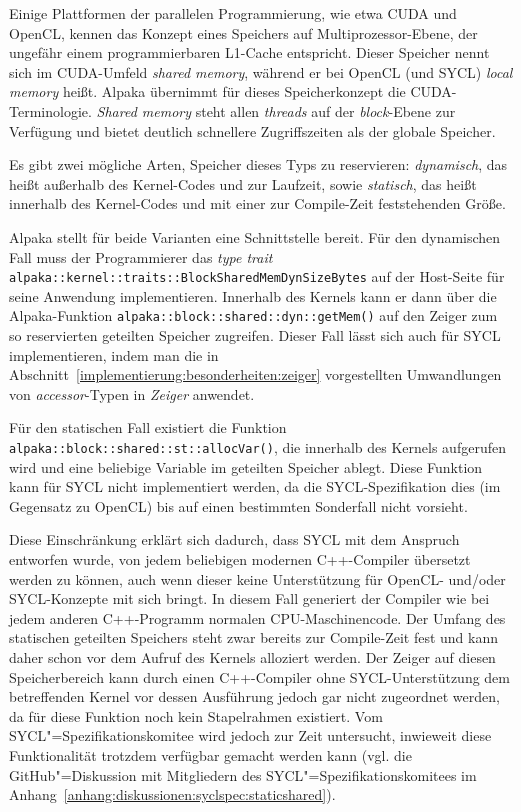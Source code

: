 Einige Plattformen der parallelen Programmierung, wie etwa CUDA und OpenCL,
kennen das Konzept eines Speichers auf Multiprozessor-Ebene, der ungefähr
einem programmierbaren L1-Cache entspricht. Dieser Speicher nennt sich im
CUDA-Umfeld \textit{shared memory}, während er bei OpenCL (und SYCL)
\textit{local memory} heißt. Alpaka übernimmt für dieses Speicherkonzept die
CUDA-Terminologie. \textit{Shared memory} steht allen \textit{threads} auf
der \textit{block}-Ebene zur Verfügung und bietet deutlich schnellere
Zugriffszeiten als der globale Speicher.

Es gibt zwei mögliche Arten, Speicher dieses Typs zu reservieren:
\textit{dynamisch}, das heißt außerhalb des Kernel-Codes und zur Laufzeit, sowie
\textit{statisch}, das heißt innerhalb des Kernel-Codes und mit einer zur
Compile-Zeit feststehenden Größe.

Alpaka stellt für beide Varianten eine Schnittstelle bereit. Für den dynamischen
Fall muss der Programmierer das \textit{type trait}
\texttt{alpaka::kernel::traits::BlockSharedMemDynSizeBytes} auf der Host-Seite
für seine Anwendung implementieren. Innerhalb des Kernels kann er dann über die
Alpaka-Funktion \texttt{alpaka::block::shared::dyn::getMem()} auf den Zeiger
zum so reservierten geteilten Speicher zugreifen. Dieser Fall lässt sich auch
für SYCL implementieren, indem man die in
Abschnitt~\ref{implementierung:besonderheiten:zeiger} vorgestellten
Umwandlungen von \textit{accessor}-Typen in \textit{Zeiger} anwendet.

Für den statischen Fall existiert die Funktion
\texttt{alpaka::block::shared::st::allocVar()}, die innerhalb des Kernels
aufgerufen wird und eine beliebige Variable im geteilten Speicher ablegt. Diese
Funktion kann für SYCL nicht implementiert werden, da die SYCL-Spezifikation
dies (im Gegensatz zu OpenCL) bis auf einen bestimmten Sonderfall
\cite[siehe][Abschnitt 4.8.5.3]{sycl2019} nicht vorsieht.

Diese Einschränkung erklärt sich dadurch, dass SYCL mit dem Anspruch entworfen
wurde, von jedem beliebigen modernen C++-Compiler übersetzt werden zu können,
auch wenn dieser keine Unterstützung für OpenCL- und/oder SYCL-Konzepte mit sich
bringt. In diesem Fall generiert der Compiler wie bei jedem anderen C++-Programm
normalen CPU-Maschinencode. Der Umfang des statischen geteilten Speichers steht
zwar bereits zur Compile-Zeit fest und kann daher schon vor dem Aufruf des
Kernels alloziert werden. Der Zeiger auf diesen Speicherbereich kann durch einen
C++-Compiler ohne SYCL-Unterstützung dem betreffenden Kernel vor dessen
Ausführung jedoch gar nicht zugeordnet werden, da für diese Funktion noch kein
Stapelrahmen existiert. Vom SYCL"=Spezifikationskomitee wird jedoch zur Zeit
untersucht, inwieweit diese Funktionalität trotzdem verfügbar gemacht werden
kann (vgl. die GitHub"=Diskussion mit Mitgliedern des
SYCL"=Spezifikationskomitees im
Anhang~\ref{anhang:diskussionen:syclspec:staticshared}).

